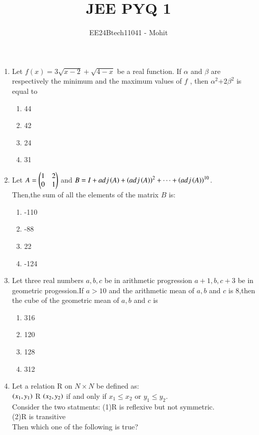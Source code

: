 \documentclass[journal,12pt,onecolumn]{IEEEtran}
\theoremstyle{remark}
\begin{document}
\title{JEE PYQ 1}
\author{EE24Btech11041 - Mohit}
\maketitle
\renewcommand{\thefigure}{\theenumi}
\renewcommand{\thetable}{\theenumi}
\begin{enumerate}
\item Let $f(x)=3\sqrt{x-2}+\sqrt{4-x}$ be a real function. If $\alpha$ and $\beta$ are respectively the minimum and the maximum values of $f$ , then $\alpha^2$+2$\beta^2$ is equal to
\begin{enumerate}
\item 44
\item 42 
\item 24
\item 31
\end{enumerate}
\item Let $A=\begin{pmatrix}1&2\\0&1\end{pmatrix}$ and $B=I+adj\left(A\right)+\left(adj\left(A\right)\right)^2+\dots+\left(adj\left(A\right)\right)^{10}$.\\
Then,the sum of all the elements of the matrix $B$ is:
\begin{enumerate}
\item -110
\item -88 
\item 22
\item -124
\end{enumerate}
\item Let three real numbers $a,b,c$ be in arithmetic progression $a+1,b,c+3$ be in geometric progession.If $a>10$ and the arithmetic mean of $a,b$ and $c$ is 8,then the cube of the geometric mean of $a,b$ and $c$ is
\begin{enumerate}
\item 316
\item 120
\item 128
\item 312
\end{enumerate}
\item Let a relation R on $N\times N$ be defined as:\\
$\left(x_1,y_1\right)$ R $\left(x_2,y_2\right)$ if and only if $x_1\leq x_2$ or $y_1\leq y_2$.\\
Consider the two statments:
(1)R is reflexive but not symmetric.\\
(2)R is transitive\\
Then which one of the following is true?\\
\begin{enumerate}

\end{enumerate}
\end{enumerate}
\end{document}
